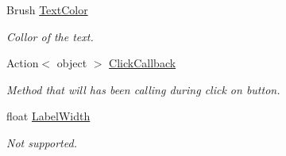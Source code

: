 \begin{DoxyCompactItemize}
Brush \mbox{\hyperlink{class_wpf_handler_1_1_u_i_1_1_controls_1_1_catalog_button_a1362ded51e8334d84f7daf89e9f656ce}{Text\+Color}}
\begin{DoxyCompactList}\small\item\em Collor of the text. \end{DoxyCompactList}\item 
Action$<$ object $>$ \mbox{\hyperlink{class_wpf_handler_1_1_u_i_1_1_controls_1_1_catalog_button_a06e2c59dcf54d8094d2b84fa6a558c56}{Click\+Callback}}
\begin{DoxyCompactList}\small\item\em Method that will has been calling during click on button. \end{DoxyCompactList}\item 
float \mbox{\hyperlink{class_wpf_handler_1_1_u_i_1_1_controls_1_1_catalog_button_ad02761d35dd16eacc261a9bcfd518e88}{Label\+Width}}
\begin{DoxyCompactList}\small\item\em Not supported. \end{DoxyCompactList}\end{DoxyCompactItemize}
